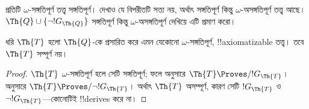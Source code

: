 \documentclass[../../../include/open-logic-section]{subfiles}
\begin{document}
\begin{prob}
  প্রতিটি $\omega$-সঙ্গতিপূর্ণ তত্ত্ব সঙ্গতিপূর্ণ। দেখাও যে বিপরীতটি সত্য
  নয়, অর্থাৎ সঙ্গতিপূর্ণ কিন্তু $\omega$-অসঙ্গতিপূর্ণ তত্ত্ব আছে।
  $\Th{Q} \cup \{\lnot !G_\Th{Q}\}$ সঙ্গতিপূর্ণ কিন্তু
  $\omega$-অসঙ্গতিপূর্ণ দেখিয়ে এটি প্রমাণ করো।
\end{prob}

\begin{thm}
 ধরি $\Th{T}$ হলো $\Th{Q}$-কে
প্রসারিত করে এমন যেকোনো $\omega$-সঙ্গতিপূর্ণ, !!{axiomatizable} তত্ত্ব।
তবে $\Th{T}$ সম্পূর্ণ নয়।
\end{thm}

\begin{proof}
  $\Th{T}$ $\omega$-সঙ্গতিপূর্ণ হলে সেটি সঙ্গতিপূর্ণ; ফলে
   অনুসারে $\Th{T} \Proves/ !G_\Th{T}$।
   অনুসারে $\Th{T} \Proves/ \lnot
  !G_\Th{T}$। অর্থাৎ $\Th{T}$ অসম্পূর্ণ, কারণ সেটি $!G_\Th{T}$ ও
  $\lnot !G_\Th{T}$—কোনোটিই !!{derive}s করে না।
\end{proof}
\end{document}
